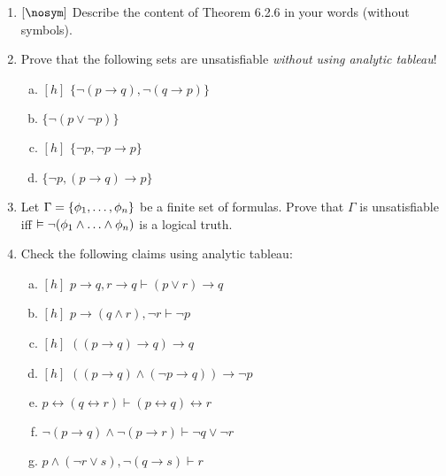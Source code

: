 	\begin{enumerate}[\thesection.1]
	
		\item {$[\nosym]$} Describe the content of Theorem 6.2.6 in your  words (without symbols).
		
		\item Prove that the following sets are unsatisfiable \emph{without using analytic tableau}!
		
		\begin{enumerate}[(a)]
		
		
			\item $[h]$ $\{\neg (p\to q), \neg (q\to p)\}$
			
			\item $\{\neg (p\lor \neg p)\}$
			
			\item $[h]$ $\{\neg p, \neg p\to p\}$
			
			\item $\{\neg p, (p\to q)\to p\}$
		
		
		\end{enumerate}
		
		\item Let $\Gamma=\{\phi_1, \mathellipsis,\phi_n\}$ be a finite set of formulas. Prove that $\Gamma$ is unsatisfiable iff $\vDash \neg (\phi_1\land\mathellipsis\land\phi_n)$ is a logical truth.
	
		\item Check the following claims using analytic tableau:
		
		\begin{enumerate}[(a)]

			\item $[h]$ $p\to q, r\to q\vdash (p\lor r)\to q$

			\item $[h]$ $p\to (q\land r), \neg r\vdash \neg p$

			\item $[h]$ $((p\to q)\to q)\to q$

			\item $[h]$ $((p\to q)\land (\neg p\to q))\to \neg p$

\item $p\leftrightarrow (q\leftrightarrow r)\vdash (p\leftrightarrow q)\leftrightarrow r$

\item $\neg(p\to q)\land \neg(p\to r)\vdash \neg q\lor \neg r$

\item $p\land (\neg r\lor s), \neg (q\to s)\vdash r$


\end{enumerate}
\end{enumerate}
